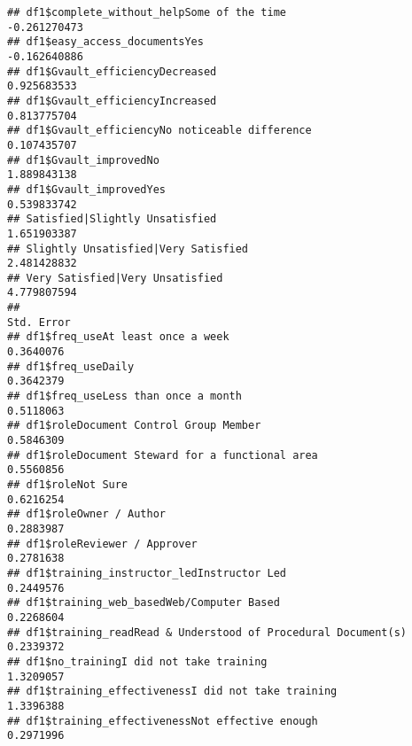 \documentclass[
]{article}
\begin{document}
\begin{verbatim}
## df1$complete_without_helpSome of the time                                                    -0.261270473
## df1$easy_access_documentsYes                                                                 -0.162640886
## df1$Gvault_efficiencyDecreased                                                                0.925683533
## df1$Gvault_efficiencyIncreased                                                                0.813775704
## df1$Gvault_efficiencyNo noticeable difference                                                 0.107435707
## df1$Gvault_improvedNo                                                                         1.889843138
## df1$Gvault_improvedYes                                                                        0.539833742
## Satisfied|Slightly Unsatisfied                                                                1.651903387
## Slightly Unsatisfied|Very Satisfied                                                           2.481428832
## Very Satisfied|Very Unsatisfied                                                               4.779807594
##                                                                                              Std. Error
## df1$freq_useAt least once a week                                                              0.3640076
## df1$freq_useDaily                                                                             0.3642379
## df1$freq_useLess than once a month                                                            0.5118063
## df1$roleDocument Control Group Member                                                         0.5846309
## df1$roleDocument Steward for a functional area                                                0.5560856
## df1$roleNot Sure                                                                              0.6216254
## df1$roleOwner / Author                                                                        0.2883987
## df1$roleReviewer / Approver                                                                   0.2781638
## df1$training_instructor_ledInstructor Led                                                     0.2449576
## df1$training_web_basedWeb/Computer Based                                                      0.2268604
## df1$training_readRead & Understood of Procedural Document(s)                                  0.2339372
## df1$no_trainingI did not take training                                                        1.3209057
## df1$training_effectivenessI did not take training                                             1.3396388
## df1$training_effectivenessNot effective enough                                                0.2971996

\end{verbatim}
\end{document}
